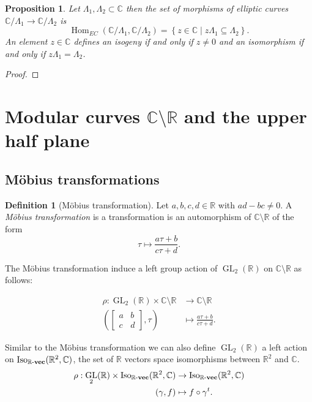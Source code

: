 \documentclass[a4paper,12pt,reqno]{amsart}
\newcommand{\set}[1]{\left\lbrace #1 \right\rbrace}
\newcommand{\field}[1]{\mathbb{#1}}  %
\newcommand{\R}{\field{R}} %
\newcommand{\C}{\field{C}} %
\newcommand{\IsoKVec}[1]{\mathrm{Iso}_{#1 {\bf\text{-}vec}}}
\newcommand{\transpose}{t}
\DeclareMathOperator{\Hom}{Hom}
\DeclareMathOperator{\GL}{GL}
\newtheorem{proposition}[lemma]{Proposition}
\theoremstyle{definition}
\newtheorem{definition}[lemma]{Definition}
\numberwithin{lemma}{section}
\numberwithin{equation}{section}
\numberwithin{figure}{section}
\begin{document}
\begin{proposition}
	Let $\Lambda_1, \Lambda_2 \subset \C$ then the set of morphisms of elliptic curves $\C/\Lambda_1 \to \C/\Lambda_2$ is $$\Hom_{EC}(\C/\Lambda_1,\C/\Lambda_2) =\set{z \in \C \mid z\Lambda_1 \subseteq \Lambda_2}.$$ 
	An element $z \in \C$ defines an isogeny if and only if $z \neq 0$ and an isomorphism if and only if $z\Lambda_1 = \Lambda_2$.
\end{proposition}
\begin{proof}
\end{proof}

\section{Modular curves $\C\setminus \R$ and the upper half plane}



\subsection{M\"obius transformations}


\begin{definition}[M\"obius transformation]\label{def:mobius-transformation}
Let $a,b,c,d \in \R$ with $ad-bc \neq 0$. A \textit{M\"obius transformation} is a transformation is an automorphism of $\C\setminus \R$ of the form
$$ \tau \mapsto \frac {a\tau+b} {c\tau +d}.$$

The M\"obius transformation induce a left group action of $\GL_2(\R)$ on $\C\setminus \R$ as follows:

\begin{align}
\rho :  \GL_2(\R) \times \C\setminus \R &\to \C\setminus \R \\
\left(\begin{bmatrix}
a & b \\ 
c & d
\end{bmatrix}  ,\tau\right) &\mapsto  \frac {a\tau+b} {c\tau +d}.
\end{align}
\end{definition}


Similar to the M\"obius transformation we can also define  $\GL_2(\R)$ a left action on $\IsoKVec{\R}(\R^2,\C)$, the set of $\R$ vectors space isomorphisms between $\R^2$ and $\C$.
\begin{align}
\rho :  \GL_2(\R) \times \IsoKVec{\R}(\R^2,\C) &\to \IsoKVec{\R}(\R^2,\C) \\
\left( \gamma  , f \right) &\mapsto  f \circ \gamma^\transpose.
\end{align}
\end{document}
